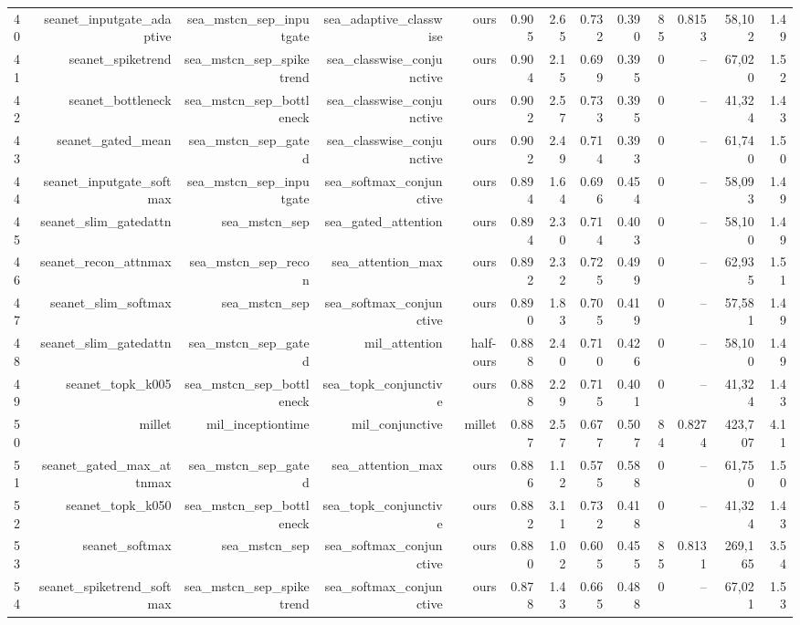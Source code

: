 \begin{table}[t]
\begin{tabular}{lrrrrrrrrrrrr}
40 & seanet\_inputgate\_adaptive & sea\_mstcn\_sep\_inputgate & sea\_adaptive\_classwise & ours & 0.905 & 2.65 & 0.732 & 0.390 & 85 & 0.8153 & 58,102 & 1.49 \\
41 & seanet\_spiketrend & sea\_mstcn\_sep\_spiketrend & sea\_classwise\_conjunctive & ours & 0.904 & 2.15 & 0.699 & 0.395 & 0 & -- & 67,020 & 1.52 \\
42 & seanet\_bottleneck & sea\_mstcn\_sep\_bottleneck & sea\_classwise\_conjunctive & ours & 0.902 & 2.57 & 0.733 & 0.395 & 0 & -- & 41,324 & 1.43 \\
43 & seanet\_gated\_mean & sea\_mstcn\_sep\_gated & sea\_classwise\_conjunctive & ours & 0.902 & 2.49 & 0.714 & 0.393 & 0 & -- & 61,740 & 1.50 \\
44 & seanet\_inputgate\_softmax & sea\_mstcn\_sep\_inputgate & sea\_softmax\_conjunctive & ours & 0.894 & 1.64 & 0.696 & 0.454 & 0 & -- & 58,093 & 1.49 \\
45 & seanet\_slim\_gatedattn & sea\_mstcn\_sep & sea\_gated\_attention & ours & 0.894 & 2.30 & 0.714 & 0.403 & 0 & -- & 58,100 & 1.49 \\
46 & seanet\_recon\_attnmax & sea\_mstcn\_sep\_recon & sea\_attention\_max & ours & 0.892 & 2.32 & 0.725 & 0.499 & 0 & -- & 62,935 & 1.51 \\
47 & seanet\_slim\_softmax & sea\_mstcn\_sep & sea\_softmax\_conjunctive & ours & 0.890 & 1.83 & 0.705 & 0.419 & 0 & -- & 57,581 & 1.49 \\
48 & seanet\_slim\_gatedattn & sea\_mstcn\_sep\_gated & mil\_attention & half-ours & 0.888 & 2.40 & 0.710 & 0.426 & 0 & -- & 58,100 & 1.49 \\
49 & seanet\_topk\_k005 & sea\_mstcn\_sep\_bottleneck & sea\_topk\_conjunctive & ours & 0.888 & 2.29 & 0.715 & 0.401 & 0 & -- & 41,324 & 1.43 \\
50 & millet & mil\_inceptiontime & mil\_conjunctive & millet & 0.887 & 2.57 & 0.677 & 0.507 & 84 & 0.8274 & 423,707 & 4.11 \\
51 & seanet\_gated\_max\_attnmax & sea\_mstcn\_sep\_gated & sea\_attention\_max & ours & 0.886 & 1.12 & 0.575 & 0.588 & 0 & -- & 61,750 & 1.50 \\
52 & seanet\_topk\_k050 & sea\_mstcn\_sep\_bottleneck & sea\_topk\_conjunctive & ours & 0.882 & 3.11 & 0.732 & 0.418 & 0 & -- & 41,324 & 1.43 \\
53 & seanet\_softmax & sea\_mstcn\_sep & sea\_softmax\_conjunctive & ours & 0.880 & 1.02 & 0.605 & 0.455 & 85 & 0.8131 & 269,165 & 3.54 \\
54 & seanet\_spiketrend\_softmax & sea\_mstcn\_sep\_spiketrend & sea\_softmax\_conjunctive & ours & 0.878 & 1.43 & 0.665 & 0.488 & 0 & -- & 67,021 & 1.53 \\

\end{tabular}
\end{table}
